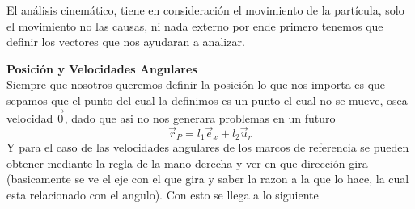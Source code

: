 \begin{tcolorbox}[title=Solucion,breakable]
\begin{center}
\end{center}
El análisis cinemático, tiene en consideración el movimiento de la partícula, solo el movimiento no las causas, ni nada externo por ende primero tenemos que definir los vectores que nos ayudaran a analizar.

        
\textbf{Posición y Velocidades Angulares}\\
        Siempre que nosotros queremos definir la posición lo que nos importa es que sepamos que el punto del cual la definimos es un punto el cual no se mueve, osea velocidad $\vec{0}$, dado que asi no nos generara problemas en un futuro
        \begin{equation}
            \vec{r}_P=l_1\vec{e}_x+l_2\vec{u}_r 
        \end{equation}
        Y para el caso de las velocidades angulares de los marcos de referencia se pueden obtener mediante la regla de la mano derecha y ver en que dirección gira (basicamente se ve el eje con el que gira y saber la razon a la que lo hace, la cual esta relacionado con el angulo). Con esto se llega a lo siguiente
        

\end{tcolorbox}
